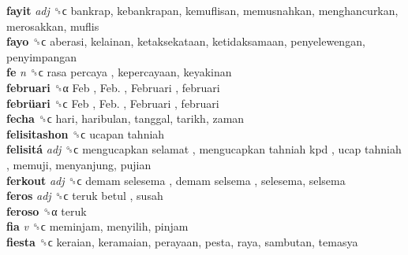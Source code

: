 \textbf{fayit} \emph{adj}  ␝ϲ  bankrap, kebankrapan, kemuflisan, memusnahkan, menghancurkan, merosakkan, muflis  \\
\textbf{fayo} ␝ϲ  aberasi, kelainan, ketaksekataan, ketidaksamaan, penyelewengan, penyimpangan  \\
\textbf{fe} \emph{n}  ␝ϲ   rasa percaya , kepercayaan, keyakinan  \\
\textbf{februari} ␝α   Feb ,  Feb. ,  Februari , februari  \\
\textbf{febrüari} ␝ϲ   Feb ,  Feb. ,  Februari , februari  \\
\textbf{fecha} ␝ϲ  hari, haribulan, tanggal, tarikh, zaman  \\
\textbf{felisitashon} ␝ϲ   ucapan tahniah   \\
\textbf{felisitá} \emph{adj}  ␝ϲ   mengucapkan selamat ,  mengucapkan tahniah kpd ,  ucap tahniah , memuji, menyanjung, pujian  \\
\textbf{ferkout} \emph{adj}  ␝ϲ   demam selesema ,  demam selsema , selesema, selsema  \\
\textbf{feros} \emph{adj}  ␝ϲ   teruk betul , susah  \\
\textbf{feroso} ␝α  teruk  \\
\textbf{fia} \emph{v}  ␝ϲ  meminjam, menyilih, pinjam  \\
\textbf{fiesta} ␝ϲ  keraian, keramaian, perayaan, pesta, raya, sambutan, temasya  \\
